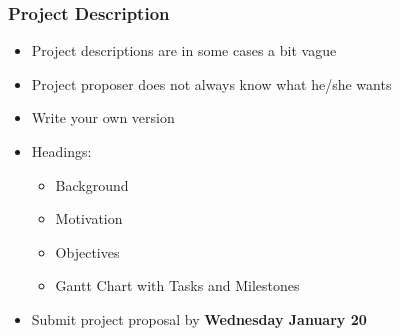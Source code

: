 \documentclass[hyperref={pdfpagelabels=false}, aspectratio=1610]{beamer}
\begin{document}
\begin{frame}
\frametitle{Project Description}
\begin{block}{}
 \begin{itemize}
  \item Project descriptions are in some cases a bit vague
  \item Project proposer does not always know what he/she wants
  \item Write your own version
  \item Headings:
  \begin{itemize}
  	\item Background
	\item Motivation
	\item Objectives
	\item Gantt Chart with Tasks and Milestones
  \end{itemize}
  \item Submit project proposal by \textbf{Wednesday January 20}
 \end{itemize}
\end{block}
\end{frame}
\end{document}
